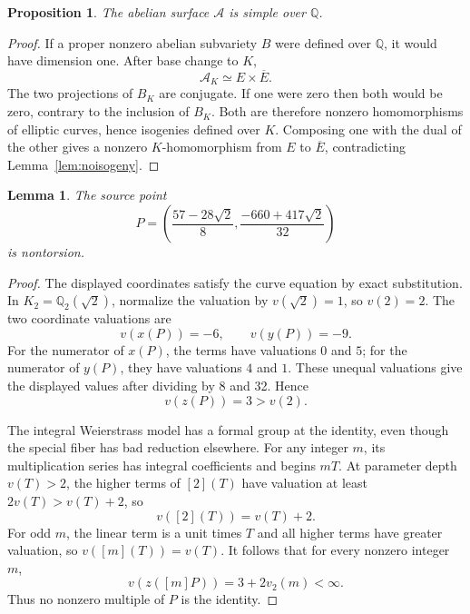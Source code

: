 \documentclass[11pt]{article}
\newtheorem{lemma}[theorem]{Lemma}
\newtheorem{proposition}[theorem]{Proposition}
\newcommand{\Q}{\mathbb Q}
\begin{document}
\begin{proposition}\label{prop:simple}
The abelian surface \(\mathcal A\) is simple over
\(\Q\).
\end{proposition}
\begin{proof}
If a proper nonzero abelian subvariety \(B\) were
defined over \(\Q\), it would have dimension one.
After base change to \(K\),
\[
                      \mathcal A_K\simeq E\times\overline E.
\]
The two projections of \(B_K\) are conjugate. If one
were zero then both would be zero, contrary to the
inclusion of \(B_K\). Both are therefore nonzero
homomorphisms of elliptic curves, hence isogenies
defined over \(K\). Composing one with the dual of
the other gives a nonzero \(K\)-homomorphism from
\(E\) to \(\overline E\), contradicting
Lemma~\ref{lem:noisogeny}.
\end{proof}

\begin{lemma}\label{lem:nontorsion}
The source point
\[
 P=\left(\frac{57-28\sqrt2}{8},
         \frac{-660+417\sqrt2}{32}\right)
\]
is nontorsion.
\end{lemma}
\begin{proof}
The displayed coordinates satisfy the curve equation
by exact substitution. In \(K_2=\Q_2(\sqrt2)\),
normalize the valuation by \(v(\sqrt2)=1\), so
\(v(2)=2\). The two coordinate valuations are
\[
                         v(x(P))=-6,\qquad v(y(P))=-9.
\]
For the numerator of \(x(P)\), the terms have
valuations \(0\) and \(5\); for the numerator of
\(y(P)\), they have valuations \(4\) and \(1\).
These unequal valuations give the displayed values
after dividing by 8 and 32. Hence
\[
                          v(z(P))=3>v(2).
\]

The integral Weierstrass model has a formal group
at the identity, even though the special fiber
has bad reduction elsewhere. For any integer \(m\),
its multiplication series has integral coefficients
and begins \(mT\). At parameter depth \(v(T)>2\),
the higher terms of \([2](T)\) have valuation at
least \(2v(T)>v(T)+2\), so
\[
                          v([2](T))=v(T)+2.
\]
For odd \(m\), the linear term is a unit times
\(T\) and all higher terms have greater valuation,
so \(v([m](T))=v(T)\). It follows that for every
nonzero integer \(m\),
\[
                  v(z([m]P))=3+2v_2(m)<\infty.
\]
Thus no nonzero multiple of \(P\) is the identity.
\end{proof}
\end{document}
